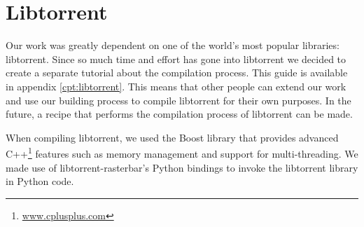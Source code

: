 \section{Libtorrent}
	Our work was greatly dependent on one of the world's most popular libraries: libtorrent. Since so much time and effort has gone into libtorrent  we decided to create a separate tutorial about the compilation process. This guide is available in appendix \ref{cpt:libtorrent}. This means that other people can extend our work and use our building process to compile libtorrent for their own purposes. In the future, a recipe that performs the compilation process of libtorrent can be made.
	
	When compiling libtorrent, we used the Boost library that provides advanced C++\footnote{\href{http://www.cplusplus.com}{www.cplusplus.com}} features such as memory management and support for multi-threading. We made use of libtorrent-rasterbar's Python bindings to invoke the libtorrent library in Python code.

